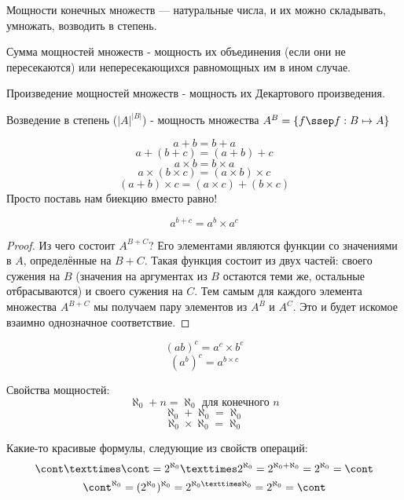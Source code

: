Мощности конечных множеств — натуральные числа, и их можно складывать, умножать, возводить в степень.

\begin{definition} \thmslashn

	Сумма мощностей множеств - мощность их объединения (если они не пересекаются) или непересекающихся равномощных им в ином случае.
\end{definition}

\begin{definition} \thmslashn

	Произведение мощностей множеств - мощность их Декартового произведения.
\end{definition}

\begin{definition} \thmslashn

	Возведение в степень ($|A|^{|B|}$) - мощность множества $A^B = \{f \ssep f: B \mapsto  A\}$
\end{definition}

\[a + b = b + a\]
\[a + (b + c) = (a + b) + c\]
\[a × b = b × a\]
\[a × (b × c) = (a × b) × c\]
\[(a + b) × c = (a × c) + (b × c)\]
Просто поставь нам биекцию вместо равно!

\begin{theorem} \thmslashn

	\[a^{b+c} = a^b × a^c\]
	
	\begin{proof} \thmslashn
	
		Из чего состоит $A^{B+C}$? Его элементами являются функции со значениями в $A$, определённые на $B + C$. Такая функция состоит из двух частей: своего сужения на $B$ (значения на аргументах из $B$ остаются теми же, остальные отбрасываются) и своего сужения на $C$. Тем самым для каждого элемента множества $A^{B+C}$ мы получаем пару элементов из $A^B$ и $A^C$. Это и будет искомое взаимно однозначное соответствие.
	\end{proof}
\end{theorem}

\[(ab)^c = a^c × b^c\]
\[(a^b)^c = a^{b × c}\]


Свойства мощностей:
\[\aleph_0 + n = \aleph_0 \text{ для конечного } n \]
\[\aleph_0 + \aleph_0 = \aleph_0\]
\[\aleph_0 × \aleph_0 = \aleph_0\]

Какие-то красивые формулы, следующие из свойств операций:
\[\cont × \cont = 2^{\aleph_0} × 2^{\aleph_0} = 2^{\aleph_0 + \aleph_0} = 2^{\aleph_0} = \cont\]
\[\cont^{\aleph_0} = (2^{\aleph_0})^{\aleph_0} = 2^{\aleph_0×\aleph_0} = 2^{\aleph_0} = \cont\]


















